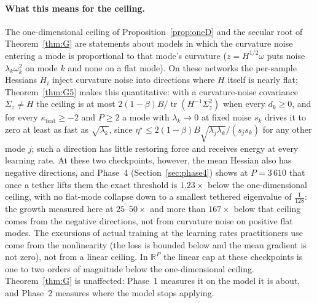 \documentclass[11pt]{article}
\theoremstyle{remark}
\newcommand{\R}{\mathbb{R}}
\newcommand{\tr}{\operatorname{tr}}
\begin{document}
\paragraph{What this means for the ceiling.} The one-dimensional ceiling of Proposition~\ref{prop:oneD} and the secular root of Theorem~\ref{thm:G} are statements about models in which the curvature noise entering a mode is proportional to that mode's curvature ($z=H^{1/2}\omega$ puts noise $\lambda_k\omega_k^2$ on mode $k$ and none on a flat mode). On these networks the per-sample Hessians $H_i$ inject curvature noise into directions where $H$ itself is nearly flat; Theorem~\ref{thm:G5} makes this quantitative: with a curvature-noise covariance $\Sigma_z\ne H$ the ceiling is at most $2(1-\beta)B/\tr(H^{-1}\Sigma_z^2)$ when every $d_k\ge0$, and for every $\kappa_{\mathrm{feat}}\ge-2$ and $P\ge2$ a mode with $\lambda_k\to0$ at fixed noise $s_k$ drives it to zero at least as fast as $\sqrt{\lambda_k}$, since $\eta^\star\le2(1-\beta)B\sqrt{\lambda_j\lambda_k}/(s_js_k)$ for any other mode $j$; such a direction has little restoring force and receives energy at every learning rate. At these two checkpoints, however, the mean Hessian also has negative directions, and Phase~4 (Section~\ref{sec:phase4}) shows at $P=3\,610$ that once a tether lifts them the exact threshold is $1.23\times$ below the one-dimensional ceiling, with no flat-mode collapse down to a smallest tethered eigenvalue of $\frac1{128}$: the growth measured here at $25$--$50\times$ and more than $167\times$ below that ceiling comes from the negative directions, not from curvature noise on positive flat modes. The excursions of actual training at the learning rates practitioners use come from the nonlinearity (the loss is bounded below and the mean gradient is not zero), not from a linear ceiling. In $\R^P$ the linear cap at these checkpoints is one to two orders of magnitude below the one-dimensional ceiling. Theorem~\ref{thm:G} is unaffected: Phase~1 measures it on the model it is about, and Phase~2 measures where the model stops applying.
\end{document}
